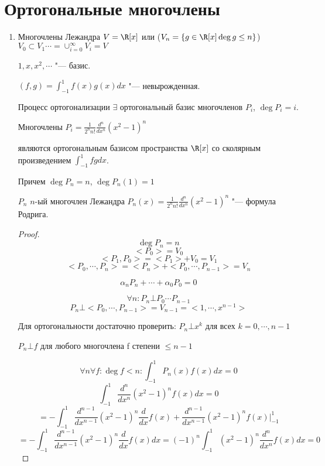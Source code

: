 ﻿\section{Ортогональные многочлены}
\begin{enumerate}
    \item Многочлены Лежандра
    $V = \R[x]$ или ($V_n = \{g \in \R[x] \deg g \le n\}$)
    $V_0 \subset V_1 \cdots = \cup_{i = 0}^{\infty}V_i = V$ 

    $1,x, x^2, \cdots$ "--- базис. 

    $(f, g) = \int_{-1}^{1}f(x)g(x)dx$ "--- невырожденная. 

    Процесс ортогонализации $\exists$ ортогональный базис многочленов $P_i$, $\deg P_i = i$.

    \begin{theorem}{}
        Многочлены $P_i = \frac{1}{2^nn!}\frac{d^n}{dx^n}(x^2 - 1)^n$

        являются ортогональным базисом пространства $\R[x]$ со сколярным произведением $\int_{-1}^{1}fgdx$.

        Причем $\deg P_n = n$, $\deg P_n(1) = 1$
    \end{theorem}
    \begin{Def}
    $P_n$ $n$-ый многочлен Лежандра
    $P_n(x) = \frac{1}{2^nn!}\frac{d^n}{dx^n}(x^2 - 1)^n$ "--- формула Родрига. 
    \end{Def}
    \begin{proof}
    $$\deg P_n = n$$
    $$<P_0> = V_0$$
    $$<P_1, P_0> = <P_1> + V_0 = V_1$$
    $$<P_0, \cdots, P_n> = <P_n> + <P_0, \cdots, P_{n - 1}> = V_n$$

    $$\alpha_nP_n + \cdots + \alpha_0P_0 = 0$$

    $$\forall n \colon P_n \bot P_0 \cdots P_{n - 1}$$
    $$P_n \bot <P_0, \cdots, P_{n - 1}> = V_{n - 1} = <1, \cdots, x^{n - 1}> $$

    Для ортогональности достаточно проверить: $P_n \bot x^{k}$ для всех $k = 0, \cdots, n - 1$

    $P_n \bot f$ для любого многочлена f степени $\le n - 1$

    $$\forall n \forall f \colon \deg f < n \colon \int_{-1}^{1}P_{n}(x)f(x)dx = 0$$
    $$\int_{-1}^{1}\frac{d^n}{dx^n}(x^2 - 1)^n f(x)dx = 0$$
    $$ = - \int_{-1}^{1}\frac{d^{n - 1}}{dx^{n - 1}}(x^2 - 1)^n\frac{d}{dx}f(x) + \frac{d^{n - 1}}{dx^{n - 1}}(x^2 - 1)^nf(x)|_{-1}^{1} $$
    $$ = - \int_{-1}^{1}\frac{d^{n - 1}}{dx^{n - 1}}(x^2 - 1)^n\frac{d}{dx}f(x)dx = (-1)^n\int_{-1}^{1}(x^2 - 1)^n\frac{d^n}{dx^n}f(x)dx = 0$$


\end{proof}
\end{enumerate}
